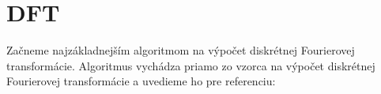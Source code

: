 \section{DFT}

Začneme najzákladnejším algoritmom na výpočet diskrétnej Fourierovej
transformácie. Algoritmus vychádza priamo zo vzorca na výpočet
diskrétnej Fourierovej transformácie a uvedieme ho pre referenciu:



